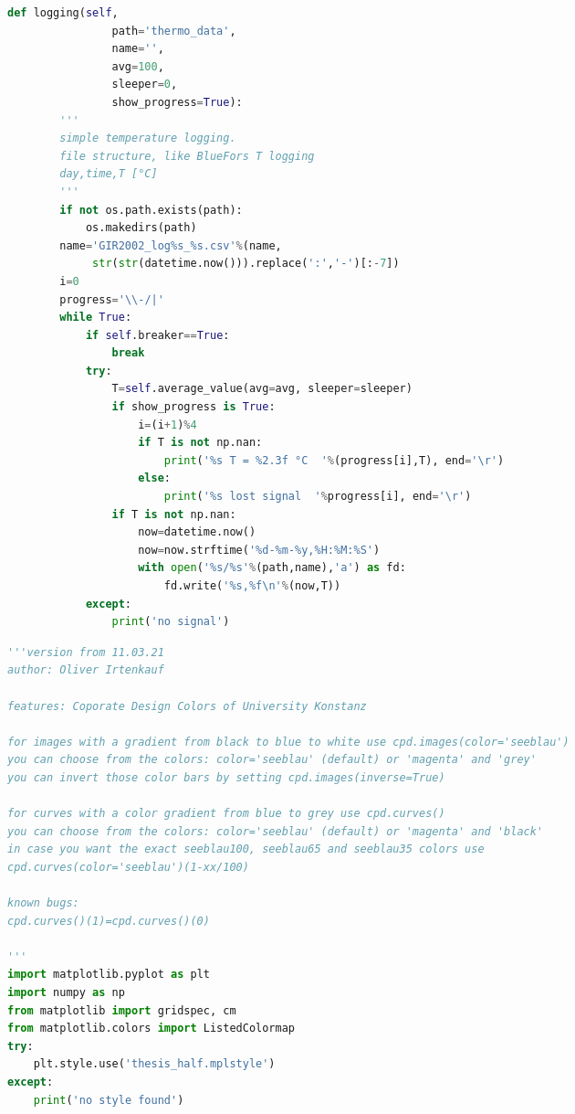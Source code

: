 \begin{landscape}
\begin{multicols}{2}
\begin{lstlisting}[language=Python]
    def logging(self,
                path='thermo_data',
                name='',
                avg=100,
                sleeper=0,
                show_progress=True):
        '''
        simple temperature logging.
        file structure, like BlueFors T logging
        day,time,T [°C]
        '''
        if not os.path.exists(path):
            os.makedirs(path)
        name='GIR2002_log%s_%s.csv'%(name,
             str(str(datetime.now())).replace(':','-')[:-7])
        i=0
        progress='\\-/|'
        while True:
            if self.breaker==True:
                break
            try:
                T=self.average_value(avg=avg, sleeper=sleeper)
                if show_progress is True:
                    i=(i+1)%4
                    if T is not np.nan:
                        print('%s T = %2.3f °C  '%(progress[i],T), end='\r')
                    else:
                        print('%s lost signal  '%progress[i], end='\r')
                if T is not np.nan:
                    now=datetime.now()
                    now=now.strftime('%d-%m-%y,%H:%M:%S')
                    with open('%s/%s'%(path,name),'a') as fd:
                        fd.write('%s,%f\n'%(now,T))
            except:
                print('no signal')
\end{lstlisting}

\begin{lstlisting}[language=Python]
'''version from 11.03.21
author: Oliver Irtenkauf

features: Coporate Design Colors of University Konstanz

for images with a gradient from black to blue to white use cpd.images(color='seeblau')
you can choose from the colors: color='seeblau' (default) or 'magenta' and 'grey'
you can invert those color bars by setting cpd.images(inverse=True)

for curves with a color gradient from blue to grey use cpd.curves()
you can choose from the colors: color='seeblau' (default) or 'magenta' and 'black'
in case you want the exact seeblau100, seeblau65 and seeblau35 colors use
cpd.curves(color='seeblau')(1-xx/100)

known bugs:
cpd.curves()(1)=cpd.curves()(0)

'''
import matplotlib.pyplot as plt
import numpy as np
from matplotlib import gridspec, cm
from matplotlib.colors import ListedColormap
try:
    plt.style.use('thesis_half.mplstyle')
except:
    print('no style found')


\end{lstlisting}
\end{multicols}
\end{landscape}
